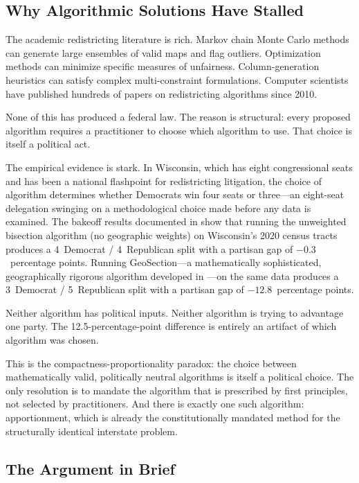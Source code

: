 \subsection{Why Algorithmic Solutions Have Stalled}

The academic redistricting literature is rich.
Markov chain Monte Carlo methods \citep{deford2019,metric2018} can generate
large ensembles of valid maps and flag outliers.
Optimization methods \citep{gurnee2021} can minimize specific measures of
unfairness.
Column-generation heuristics can satisfy complex multi-constraint formulations.
Computer scientists have published hundreds of papers on redistricting algorithms
since 2010.

None of this has produced a federal law.
The reason is structural: every proposed algorithm requires a practitioner to
choose which algorithm to use.
That choice is itself a political act.

The empirical evidence is stark.
In Wisconsin, which has eight congressional seats and has been a national
flashpoint for redistricting litigation, the choice of algorithm determines
whether Democrats win four seats or three---an eight-seat delegation swinging
on a methodological choice made before any data is examined.
The bakeoff results documented in \citet{b0paper} show that running the
unweighted bisection algorithm (no geographic weights) on Wisconsin's
2020 census tracts produces a 4~Democrat / 4~Republican split with a partisan
gap of $-0.3$~percentage points.
Running GeoSection---a mathematically sophisticated, geographically rigorous
algorithm developed in \citet{b8paper}---on the same data produces a
3~Democrat / 5~Republican split with a partisan gap of $-12.8$~percentage points.

Neither algorithm has political inputs.
Neither algorithm is trying to advantage one party.
The 12.5-percentage-point difference is entirely an artifact of which algorithm
was chosen.

This is the compactness-proportionality paradox: the choice between
mathematically valid, politically neutral algorithms is itself a political
choice.
The only resolution is to mandate the algorithm that is prescribed by
first principles, not selected by practitioners.
And there is exactly one such algorithm: \hh{} apportionment, which is already
the constitutionally mandated method for the structurally identical
interstate problem.

\subsection{The Argument in Brief}

